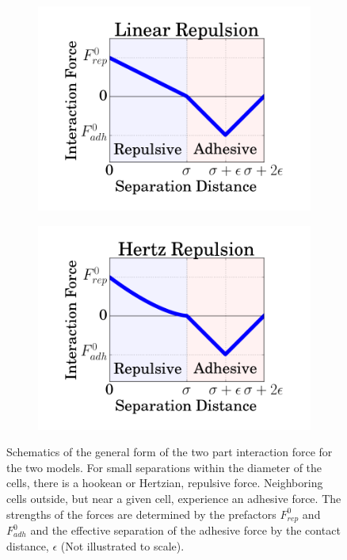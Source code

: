 \documentclass[aps,prb,twocolumn,groupedaddress,nofootinbib,floatfix]{revtex4}
\begin{document}
\begin{figure}
  \begin{subfigure}{\columnwidth}
    \includegraphics[width=1.0\columnwidth]{interaction.png}
  \end{subfigure}
  \begin{subfigure}{\columnwidth}
    \includegraphics[width=1.0\columnwidth]{hertz.png}
  \end{subfigure}
  \label{fig:interaction}
  \caption[capsuleECM]{Schematics of the general form of the two part interaction force for the two models. For small separations within the diameter of the cells, there is a hookean or Hertzian, repulsive force. Neighboring cells outside, but near a given cell, experience an adhesive force. The strengths of the forces are determined by the prefactors $F_{rep}^0$ and $F_{adh}^0$ and the effective separation of the adhesive force by the contact distance, $\epsilon$  (Not illustrated to scale).}
\end{figure}
\end{document}
